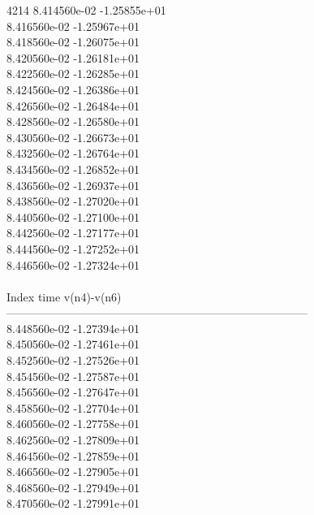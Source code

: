4214	8.414560e-02	-1.25855e+01	\\ 	8.416560e-02	-1.25967e+01	\\ 	8.418560e-02	-1.26075e+01	\\ 	8.420560e-02	-1.26181e+01	\\ 	8.422560e-02	-1.26285e+01	\\ 	8.424560e-02	-1.26386e+01	\\ 	8.426560e-02	-1.26484e+01	\\ 	8.428560e-02	-1.26580e+01	\\ 	8.430560e-02	-1.26673e+01	\\ 	8.432560e-02	-1.26764e+01	\\ 	8.434560e-02	-1.26852e+01	\\ 	8.436560e-02	-1.26937e+01	\\ 	8.438560e-02	-1.27020e+01	\\ 	8.440560e-02	-1.27100e+01	\\ 	8.442560e-02	-1.27177e+01	\\ 	8.444560e-02	-1.27252e+01	\\ 	8.446560e-02	-1.27324e+01	\\ \hline
\\ \hline
Index   time            v(n4)-v(n6)     \\ \hline
--------------------------------------------------------------------------------\\ 	8.448560e-02	-1.27394e+01	\\ 	8.450560e-02	-1.27461e+01	\\ 	8.452560e-02	-1.27526e+01	\\ 	8.454560e-02	-1.27587e+01	\\ 	8.456560e-02	-1.27647e+01	\\ 	8.458560e-02	-1.27704e+01	\\ 	8.460560e-02	-1.27758e+01	\\ 	8.462560e-02	-1.27809e+01	\\ 	8.464560e-02	-1.27859e+01	\\ 	8.466560e-02	-1.27905e+01	\\ 	8.468560e-02	-1.27949e+01	\\ 	8.470560e-02	-1.27991e+01	\\ \hline
